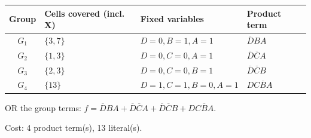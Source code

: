 \documentclass[a4paper,11pt]{article}
\begin{document}
\begin{minipage}{\textwidth}
\begin{center}\small
\begin{tabular}{clll}
\toprule
Group & Cells covered (incl. X) & Fixed variables & Product term\\\midrule
\textcolor{blue!75!black}{$G_{1}$} & $\{3,7\}$ & $D=0,B=1,A=1$ & $\overline{D}BA$\\
\textcolor{red!75!black}{$G_{2}$} & $\{1,3\}$ & $D=0,C=0,A=1$ & $\overline{D}\overline{C}A$\\
\textcolor{teal!80!black}{$G_{3}$} & $\{2,3\}$ & $D=0,C=0,B=1$ & $\overline{D}\overline{C}B$\\
\textcolor{violet!85!black}{$G_{4}$} & $\{13\}$ & $D=1,C=1,B=0,A=1$ & $DC\overline{B}A$\\
\bottomrule\end{tabular}\end{center}


\noindent OR the group terms: $\boxed{f=\overline{D}BA + \overline{D}\overline{C}A + \overline{D}\overline{C}B + DC\overline{B}A}$.

\noindent Cost: 4 product term(s), 13 literal(s).

\end{minipage}\par\vspace{0.25cm}

\clearpage
\end{document}
